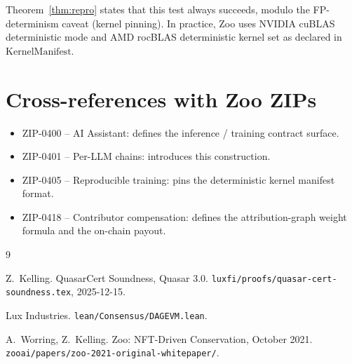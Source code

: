 \documentclass[11pt]{article}
\begin{document}
Theorem~\ref{thm:repro} states that this test always succeeds,
modulo the FP-determinism caveat (kernel pinning).  In practice,
Zoo uses NVIDIA cuBLAS deterministic mode and AMD rocBLAS
deterministic kernel set as declared in
$\mathrm{KernelManifest}$.

\section{Cross-references with Zoo ZIPs}
\label{sec:zip}

\begin{itemize}[nosep]
  \item ZIP-0400 -- AI Assistant: defines the inference / training
        contract surface.
  \item ZIP-0401 -- Per-LLM chains: introduces this construction.
  \item ZIP-0405 -- Reproducible training: pins the deterministic
        kernel manifest format.
  \item ZIP-0418 -- Contributor compensation: defines the
        attribution-graph weight formula and the on-chain payout.
\end{itemize}

\begin{thebibliography}{9}

Z.~Kelling.
\newblock QuasarCert Soundness, Quasar 3.0.
\newblock \texttt{luxfi/proofs/quasar-cert-soundness.tex}, 2025-12-15.

Lux Industries.
\newblock \texttt{lean/Consensus/DAGEVM.lean}.

A.~Worring, Z.~Kelling.
\newblock Zoo: NFT-Driven Conservation, October 2021.
\newblock \texttt{zooai/papers/zoo-2021-original-whitepaper/}.

\end{thebibliography}
\end{document}
